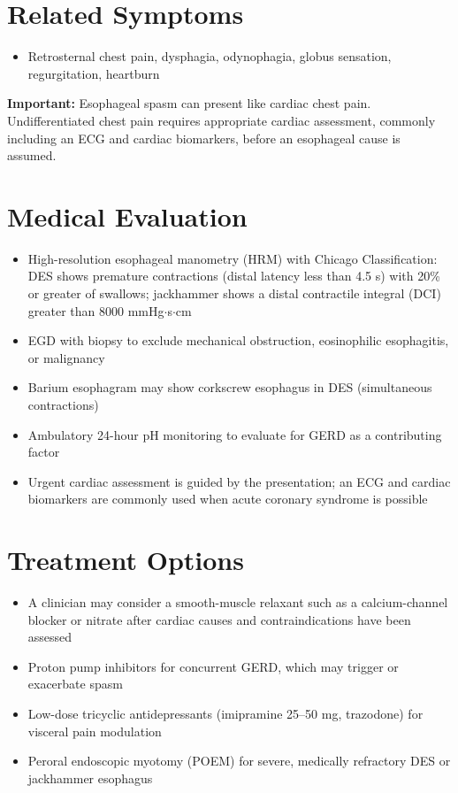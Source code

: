 \section*{Related Symptoms}
\begin{itemize}
  \item Retrosternal chest pain, dysphagia, odynophagia, globus sensation, regurgitation, heartburn
\end{itemize}
\textbf{Important:} Esophageal spasm can present like cardiac chest pain. Undifferentiated chest pain requires appropriate cardiac assessment, commonly including an ECG and cardiac biomarkers, before an esophageal cause is assumed.

\section*{Medical Evaluation}
\begin{itemize}
  \item High-resolution esophageal manometry (HRM) with Chicago Classification: DES shows premature contractions (distal latency less than 4.5 s) with 20\% or greater of swallows; jackhammer shows a distal contractile integral (DCI) greater than 8000 mmHg{$\cdot$}s{$\cdot$}cm
  \rule{0pt}{0pt}
  \item EGD with biopsy to exclude mechanical obstruction, eosinophilic esophagitis, or malignancy
  \item Barium esophagram may show corkscrew esophagus in DES (simultaneous contractions)
  \item Ambulatory 24-hour pH monitoring to evaluate for GERD as a contributing factor
  \item Urgent cardiac assessment is guided by the presentation; an ECG and cardiac biomarkers are commonly used when acute coronary syndrome is possible
\end{itemize}

\section*{Treatment Options}
\begin{itemize}
  \item A clinician may consider a smooth-muscle relaxant such as a calcium-channel blocker or nitrate after cardiac causes and contraindications have been assessed
  \item Proton pump inhibitors for concurrent GERD, which may trigger or exacerbate spasm
  \item Low-dose tricyclic antidepressants (imipramine 25--50 mg, trazodone) for visceral pain modulation
  \item Peroral endoscopic myotomy (POEM) for severe, medically refractory DES or jackhammer esophagus
\end{itemize}

